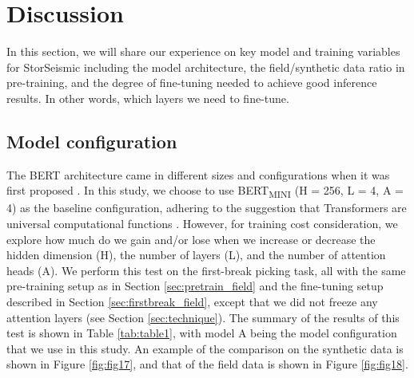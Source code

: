 \documentclass{article}
\begin{document}
\section{Discussion}
\label{sec:discussion}
In this section, we will share our experience on key model and training variables for StorSeismic including the model architecture, the field/synthetic data ratio in pre-training, and the degree of fine-tuning needed to achieve good inference results. In other words, which layers we need to fine-tune.

\subsection{Model configuration}
The BERT architecture came in different sizes and configurations when it was first proposed \cite{devlin2018bert}. In this study, we choose to use BERT\textsubscript{MINI} (H = 256, L = 4, A = 4) as the baseline configuration, adhering to the suggestion that Transformers are universal computational functions \cite{lu2021pretrained}. However, for training cost consideration, we explore how much do we gain and/or lose when we increase or decrease the hidden dimension (H), the number of layers (L), and the number of attention heads (A). We perform this test on the first-break picking task, all with the same pre-training setup as in Section \ref{sec:pretrain_field} and the fine-tuning setup described in Section \ref{sec:firstbreak_field}, except that we did not freeze any attention layers (see Section \ref{sec:technique}). The summary of the results of this test is shown in Table \ref{tab:table1}, with model A being the model configuration that we use in this study. An example of the comparison on the synthetic data is shown in Figure \ref{fig:fig17}, and that of the field data is shown in Figure \ref{fig:fig18}.
\end{document}
